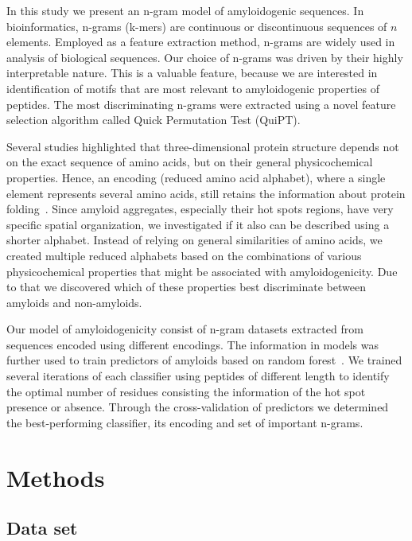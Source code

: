 \documentclass[a4,center,fleqn]{NAR}
\begin{document}
\enlargethispage{-65.1pt}

  In this study we present an n-gram model of amyloidogenic sequences. In 
bioinformatics, n-grams (k-mers) are continuous or discontinuous sequences of 
$n$ elements. Employed as a feature extraction method, n-grams are widely used 
in analysis of biological sequences. Our choice of n-grams was driven by their 
highly interpretable nature. This is a valuable feature, because we are 
interested in identification of motifs that are most relevant to amyloidogenic 
properties of peptides. The most discriminating n-grams were extracted using a 
novel feature selection algorithm called Quick Permutation Test (QuiPT).

  Several studies highlighted that three-dimensional protein structure depends 
not on the exact sequence of amino acids, but on their general physicochemical 
properties. Hence, an encoding (reduced amino acid alphabet), where a single 
element represents several amino acids, still retains the information about 
protein folding~\citep{murphy_simplified_2000}. Since amyloid aggregates, 
especially their hot spots regions, have very specific spatial organization, we 
investigated if it also can be described using a shorter alphabet. Instead of 
relying on general similarities of amino acids, we created multiple reduced 
alphabets based on the combinations of various physicochemical properties that 
might be associated with amyloidogenicity. Due to that we discovered which of 
these properties best discriminate between amyloids and non-amyloids.

  Our model of amyloidogenicity consist of n-gram datasets extracted from 
sequences encoded using different encodings. The information 
in models was further used to train predictors of amyloids based on random 
forest~\citep{breiman_random_2001}. We trained several iterations of each 
classifier using peptides of different length to identify the optimal number of 
residues consisting the information of the hot spot presence or absence. 
Through the cross-validation of predictors we determined the best-performing 
classifier, its encoding and set of important n-grams.


\section{Methods}
\subsection{Data set}
\end{document}

